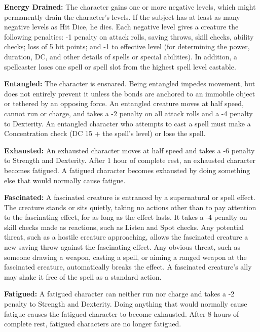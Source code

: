 \documentclass{article}
\begin{document}
\vspace{12pt}
\textbf{Energy Drained:} The character gains one or more negative levels, which 
might permanently drain the character's levels. If the subject has at least as 
many negative levels as Hit Dice, he dies. Each negative level gives a creature 
the following penalties: -1 penalty on attack rolls, saving throws, skill checks, 
ability checks; loss of 5 hit points; and -1 to effective level (for determining 
the power, duration, DC, and other details of spells or special abilities). In 
addition, a spellcaster loses one spell or spell slot from the highest spell level 
castable.

\vspace{12pt}
\textbf{Entangled:} The character is ensnared. Being entangled impedes movement, 
but does not entirely prevent it unless the bonds are anchored to an immobile object 
or tethered by an opposing force. An entangled creature moves at half speed, cannot 
run or charge, and takes a -2 penalty on all attack rolls and a -4 penalty to Dexterity. 
An entangled character who attempts to cast a spell must make a Concentration check 
(DC 15 + the spell's level) or lose the spell. 

\vspace{12pt}
\textbf{Exhausted:} An exhausted character moves at half speed and takes a -6 penalty 
to Strength and Dexterity. After 1 hour of complete rest, an exhausted character 
becomes fatigued. A fatigued character becomes exhausted by doing something else 
that would normally cause fatigue.

\vspace{12pt}
\textbf{Fascinated: }A fascinated creature is entranced by a supernatural or spell 
effect. The creature stands or sits quietly, taking no actions other than to pay 
attention to the fascinating effect, for as long as the effect lasts. It takes 
a -4 penalty on skill checks made as reactions, such as Listen and Spot checks. 
Any potential threat, such as a hostile creature approaching, allows the fascinated 
creature a new saving throw against the fascinating effect. Any obvious threat, 
such as someone drawing a weapon, casting a spell, or aiming a ranged weapon at 
the fascinated creature, automatically breaks the effect. A fascinated creature's 
ally may shake it free of the spell as a standard action. 

\vspace{12pt}
\textbf{Fatigued:} A fatigued character can neither run nor charge and takes a 
-2 penalty to Strength and Dexterity. Doing anything that would normally cause 
fatigue causes the fatigued character to become exhausted. After 8 hours of complete 
rest, fatigued characters are no longer fatigued. 
\end{document}
